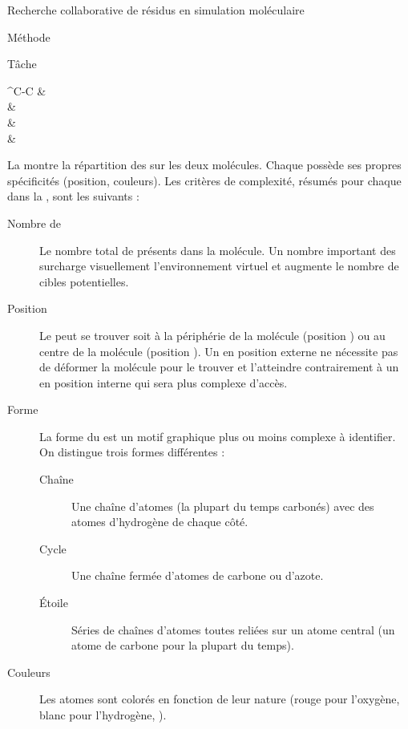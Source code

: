 \documentclass[myfrancais]{mythesis}
\begin{document}
\begin{mychapter}{Recherche collaborative de résidus en simulation moléculaire}
\begin{mysection}{Méthode}
\begin{mysubsection}{Tâche}
\begin{mytable}
\begin{mysubtable}
\begin{mytabular}[0.49\textwidth]{^C-C}
							  &   \\
							  &   \\
							  &   \\
							 &  \\
							\mybottomrule
						\end{mytabular}
					\end{mysubtable}
				\end{mytable}

				La  montre la répartition des  sur les deux molécules.
				Chaque  possède ses propres spécificités (position, couleurs\myetc).
				Les critères de complexité, résumés pour chaque  dans la , sont les suivants :
				\begin{description}
					\item[Nombre de ] Le nombre total de  présents dans la molécule.
						Un nombre important des  surcharge visuellement l'environnement virtuel et augmente le nombre de cibles potentielles.
					\item[Position] Le  peut se trouver soit à la périphérie de la molécule (position ) ou au centre de la molécule (position ).
						Un  en position externe ne nécessite pas de déformer la molécule pour le trouver et l'atteindre contrairement à un  en position interne qui sera plus complexe d'accès.
					\item[Forme] La forme du  est un motif graphique plus ou moins complexe à identifier.
						On distingue trois formes différentes :
						\begin{description}
							\item[Chaîne] Une chaîne d'atomes (la plupart du temps carbonés) avec des atomes d'hydrogène de chaque côté.
							\item[Cycle] Une chaîne fermée d'atomes de carbone ou d'azote.
							\item[Étoile] Séries de chaînes d'atomes toutes reliées sur un atome central (un atome de carbone pour la plupart du temps).
						\end{description}
					\item[Couleurs] Les atomes sont colorés en fonction de leur nature (rouge pour l'oxygène, blanc pour l'hydrogène, \myetc).

\end{description}
\end{mysubsection}
\end{mysection}
\end{mychapter}
\end{document}
